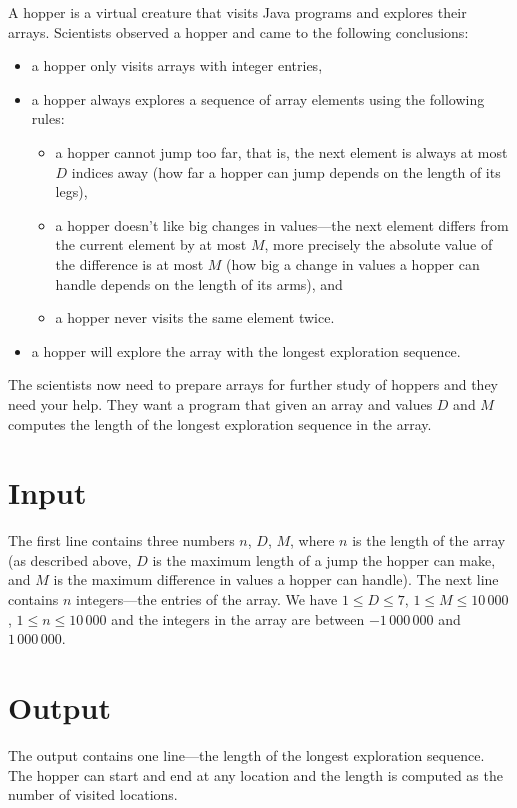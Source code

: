 
A hopper is a virtual creature that visits Java programs and explores their arrays. Scientists
observed a hopper and came to the following conclusions:
\begin{itemize}
\item a hopper only visits arrays with integer entries, 
\item a hopper always explores a sequence of array elements using the
  following rules:
  \begin{itemize}
  \item a hopper cannot jump too far, that is, the next element is
    always at most $D$ indices away (how far a hopper can jump depends
    on the length of its legs),
  \item a hopper doesn’t like big changes in values---the next element
    differs from the current element by at most $M$, more precisely
    the absolute value of the difference is at most $M$ (how big a
    change in values a hopper can handle depends on the length of its
    arms), and
  \item a hopper never visits the same element twice.
  \end{itemize}
\item a hopper will explore the array with the longest exploration
  sequence.
\end{itemize}
The scientists now need to prepare arrays for further study of hoppers and they need your
help. They want a program that given an array and values $D$ and $M$ computes the length
of the longest exploration sequence in the array.

\section*{Input}

The first line contains three numbers $n$, $D$,
$M$, where $n$ is the length of the array (as described above, $D$ is
the maximum length of a jump the hopper can make, and $M$ is the
maximum difference in values a hopper can handle). The next line
contains $n$ integers---the entries of the array. We have
$1 \leq D \leq 7$, $1 \leq M \leq 10\,000$, $1 \leq n \leq 10\,000$
and the integers in the array are between $-1\,000\,000$ and
$1\,000\,000$.

\section*{Output}

The output contains one line---the length of the
longest exploration sequence. The hopper can start and end at any
location and the length is computed as the number of visited
locations.
